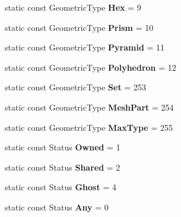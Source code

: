 \begin{DoxyCompactItemize}
\item 
\hypertarget{classINMOST_1_1Element_aa118032da38a237b4bfe999bcea30616}{static const Geometric\-Type {\bfseries Hex} = 9}\label{classINMOST_1_1Element_aa118032da38a237b4bfe999bcea30616}

\item 
\hypertarget{classINMOST_1_1Element_a1c5357c5bc37b9a18448f45b2999ff93}{static const Geometric\-Type {\bfseries Prism} = 10}\label{classINMOST_1_1Element_a1c5357c5bc37b9a18448f45b2999ff93}

\item 
\hypertarget{classINMOST_1_1Element_a7be746df43ae83225c179d9c09205904}{static const Geometric\-Type {\bfseries Pyramid} = 11}\label{classINMOST_1_1Element_a7be746df43ae83225c179d9c09205904}

\item 
\hypertarget{classINMOST_1_1Element_a03a7256f661e0a0a5ff9008a694370d4}{static const Geometric\-Type {\bfseries Polyhedron} = 12}\label{classINMOST_1_1Element_a03a7256f661e0a0a5ff9008a694370d4}

\item 
\hypertarget{classINMOST_1_1Element_abd644aef30cb508b45f7936b8e5a6e82}{static const Geometric\-Type {\bfseries Set} = 253}\label{classINMOST_1_1Element_abd644aef30cb508b45f7936b8e5a6e82}

\item 
\hypertarget{classINMOST_1_1Element_a21768dc12b1f404d41952d8b82e46763}{static const Geometric\-Type {\bfseries Mesh\-Part} = 254}\label{classINMOST_1_1Element_a21768dc12b1f404d41952d8b82e46763}

\item 
\hypertarget{classINMOST_1_1Element_aeb3304586912f10eaa2a40f6b5b610ba}{static const Geometric\-Type {\bfseries Max\-Type} = 255}\label{classINMOST_1_1Element_aeb3304586912f10eaa2a40f6b5b610ba}

\item 
\hypertarget{classINMOST_1_1Element_a3a907402d1e52df299d3fc6db6d92e56}{static const Status {\bfseries Owned} = 1}\label{classINMOST_1_1Element_a3a907402d1e52df299d3fc6db6d92e56}

\item 
\hypertarget{classINMOST_1_1Element_a0251c6ad6407192d9a41b7ad3587bfdb}{static const Status {\bfseries Shared} = 2}\label{classINMOST_1_1Element_a0251c6ad6407192d9a41b7ad3587bfdb}

\item 
\hypertarget{classINMOST_1_1Element_a109dae89d1d8e4d76078f6e4498d58b5}{static const Status {\bfseries Ghost} = 4}\label{classINMOST_1_1Element_a109dae89d1d8e4d76078f6e4498d58b5}

\item 
\hypertarget{classINMOST_1_1Element_ad7f0b488fca1d2f2a832345c77f83760}{static const Status {\bfseries Any} = 0}\label{classINMOST_1_1Element_ad7f0b488fca1d2f2a832345c77f83760}

\end{DoxyCompactItemize}
